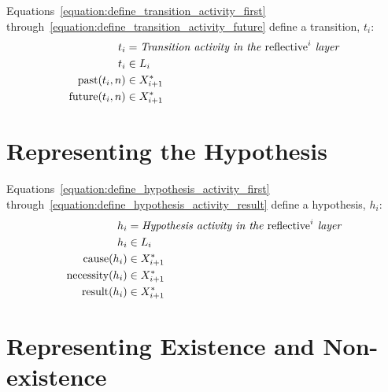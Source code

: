 Equations~\ref{equation:define_transition_activity_first}
through~\ref{equation:define_transition_activity_future} define a
transition, $t_i$:
\begin{align}
\label{equation:define_transition_activity_first}
               t_i &= \text{\emph{Transition activity in the} reflective}^i\text{\emph{ layer}} \\
               t_i &\in L_i \\
\label{equation:define_transition_activity_past}
  \text{past}(t_i, n) &\in X_{i+1}^* \\
\label{equation:define_transition_activity_future}
\text{future}(t_i, n) &\in X_{i+1}^*
\end{align}

\section{Representing the Hypothesis}

Equations~\ref{equation:define_hypothesis_activity_first}
through~\ref{equation:define_hypothesis_activity_result} define a
hypothesis, $h_i$:
\begin{align}
\label{equation:define_hypothesis_activity_first}
                  h_i &= \text{\emph{Hypothesis activity in the} reflective}^i\text{\emph{ layer}} \\
                  h_i &\in L_i \\
\label{equation:define_hypothesis_activity_cause}
    \text{cause}(h_i) &\in X_{i+1}^* \\
\label{equation:define_hypothesis_activity_necessity}
\text{necessity}(h_i) &\in X_{i+1}^* \\
\label{equation:define_hypothesis_activity_result}
   \text{result}(h_i) &\in X_{i+1}^*
\end{align}

\section{Representing Existence and Non-existence}

